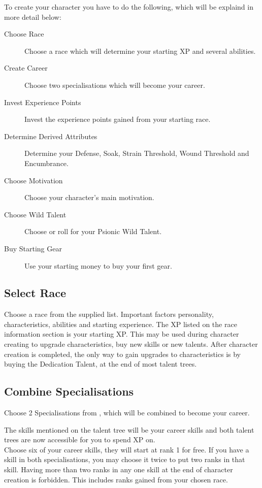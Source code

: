 \begin{multicols}{2}

To create your character you have to do the following, which will be explaind in more detail below:

\begin{description}
    \item [Choose Race] Choose a race which will determine your starting XP and several abilities.
    \item [Create Career] Choose two specialisations which will become your career.
    \item [Invest Experience Points] Invest the experience points gained from your starting race.
    \item [Determine Derived Attributes] Determine your Defense, Soak, Strain Threshold, Wound Threshold and Encumbrance.
    \item [Choose Motivation] Choose your character's main motivation.
    \item [Choose Wild Talent] Choose or roll for your Psionic Wild Talent.
    \item [Buy Starting Gear] Use your starting money to buy your first gear.
\end{description}

\subsection{Select Race}
Choose a race from the supplied list. Important factors personality, characteristics, abilities and starting experience.
The XP listed on the race information section is your starting XP. This may be used during character creating to upgrade characteristics, buy new skills or new talents.
After character creation is completed, the only way to gain upgrades to characteristics is by buying the Dedication Talent, at the end of most talent trees.

\subsection{Combine Specialisations}
Choose 2 Specialisations from , which will be combined to become your career.

The skills mentioned on the talent tree will be your career skills and both talent
trees are now accessible for you to spend XP on.\\
Choose six of your career skills, they will start at rank 1 for free. If you have
a skill in both specialisations, you may choose it twice to put two ranks in that
skill. Having more than two ranks in any one skill at the end of character creation
is forbidden. This includes ranks gained from your chosen race.


\end{multicols}
